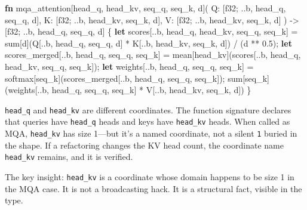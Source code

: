 \documentclass[11pt,titlepage]{article}
\newenvironment{Shaded}{}{}
\newcommand{\DataTypeTok}[1]{\textcolor[rgb]{0.56,0.13,0.00}{#1}}
\newcommand{\DecValTok}[1]{\textcolor[rgb]{0.25,0.63,0.44}{#1}}
\newcommand{\KeywordTok}[1]{\textcolor[rgb]{0.00,0.44,0.13}{\textbf{#1}}}
\newcommand{\NormalTok}[1]{#1}
\newcommand{\OperatorTok}[1]{\textcolor[rgb]{0.40,0.40,0.40}{#1}}
\begin{document}
\begin{Shaded}
\begin{Highlighting}[]
\KeywordTok{fn}\NormalTok{ mqa_attention[head_q, head_kv, seq_q, seq_k, d](}
\NormalTok{    Q: }\OperatorTok{[}\DataTypeTok{f32}\NormalTok{; ..b, head_q, seq_q, d}\OperatorTok{]}\NormalTok{,}
\NormalTok{    K: }\OperatorTok{[}\DataTypeTok{f32}\NormalTok{; ..b, head_kv, seq_k, d}\OperatorTok{]}\NormalTok{,}
\NormalTok{    V: }\OperatorTok{[}\DataTypeTok{f32}\NormalTok{; ..b, head_kv, seq_k, d}\OperatorTok{]}
\NormalTok{) -> }\OperatorTok{[}\DataTypeTok{f32}\NormalTok{; ..b, head_q, seq_q, d}\OperatorTok{]}
\OperatorTok{\{}
    \KeywordTok{let}\NormalTok{ scores}\OperatorTok{[}\NormalTok{..b, head_q, head_kv, seq_q, seq_k}\OperatorTok{]}\NormalTok{ =}
\NormalTok{        sum}\OperatorTok{[}\NormalTok{d}\OperatorTok{]}\NormalTok{(Q}\OperatorTok{[}\NormalTok{..b, head_q, seq_q, d}\OperatorTok{]}\NormalTok{ * K}\OperatorTok{[}\NormalTok{..b, head_kv, seq_k, d}\OperatorTok{]}\NormalTok{) / (d ** }\DecValTok{0.5}\NormalTok{);}
    \KeywordTok{let}\NormalTok{ scores_merged}\OperatorTok{[}\NormalTok{..b, head_q, seq_q, seq_k}\OperatorTok{]}\NormalTok{ = mean}\OperatorTok{[}\NormalTok{head_kv}\OperatorTok{]}\NormalTok{(scores}\OperatorTok{[}\NormalTok{..b, head_q, head_kv, seq_q, seq_k}\OperatorTok{]}\NormalTok{);}
    \KeywordTok{let}\NormalTok{ weights}\OperatorTok{[}\NormalTok{..b, head_q, seq_q, seq_k}\OperatorTok{]}\NormalTok{ = softmax}\OperatorTok{[}\NormalTok{seq_k}\OperatorTok{]}\NormalTok{(scores_merged}\OperatorTok{[}\NormalTok{..b, head_q, seq_q, seq_k}\OperatorTok{]}\NormalTok{);}
\NormalTok{    sum}\OperatorTok{[}\NormalTok{seq_k}\OperatorTok{]}\NormalTok{(weights}\OperatorTok{[}\NormalTok{..b, head_q, seq_q, seq_k}\OperatorTok{]}\NormalTok{ * V}\OperatorTok{[}\NormalTok{..b, head_kv, seq_k, d}\OperatorTok{]}\NormalTok{)}
\OperatorTok{\}}
\end{Highlighting}
\end{Shaded}

\texttt{head\_q} and \texttt{head\_kv} are different coordinates. The
function signature declares that queries have \texttt{head\_q} heads and
keys have \texttt{head\_kv} heads. When called as MQA, \texttt{head\_kv}
has size 1---but it's a named coordinate, not a silent \texttt{1} buried
in the shape. If a refactoring changes the KV head count, the coordinate
name \texttt{head\_kv} remains, and it is verified.

The key insight: \texttt{head\_kv} is a coordinate whose domain happens
to be size 1 in the MQA case. It is not a broadcasting hack. It is a
structural fact, visible in the type.
\end{document}
